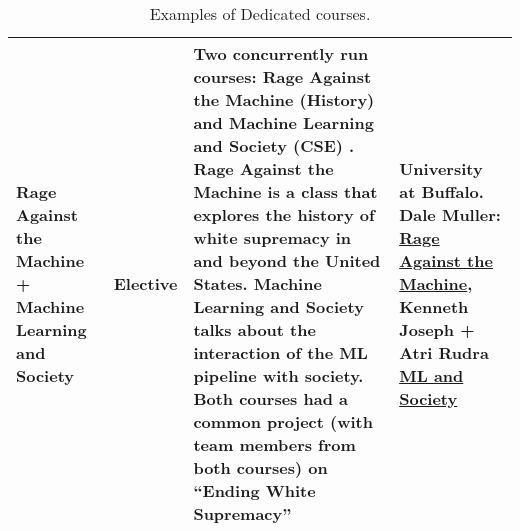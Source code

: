 \begin{table}[]
{\begin{tabular}{|P{0.1}|P{0.1}|P{0.6}|P{0.2}|}
\\
\hline
Rage Against the Machine + Machine Learning and Society&
Elective&
Two concurrently run courses: Rage Against the Machine (History) and Machine Learning and Society (CSE) . Rage Against the Machine is a class that explores the history of white supremacy in and beyond the United States. Machine Learning and Society talks about the interaction of the ML pipeline with society. Both courses  had a common project (with team members from both courses) on “Ending White Supremacy”&
University at Buffalo. Dale Muller: \href{https://daliamul.wixsite.com/rage}{Rage Against the Machine}, Kenneth Joseph + Atri Rudra \href{http://www-student.cse.buffalo.edu/~atri/ml-and-soc/spr23/}{ML and Society}
\\
\hline
    \end{tabular}
    }
    \caption{Examples of Dedicated courses.}
    \label{tab:dedicated-ex}
\end{table}